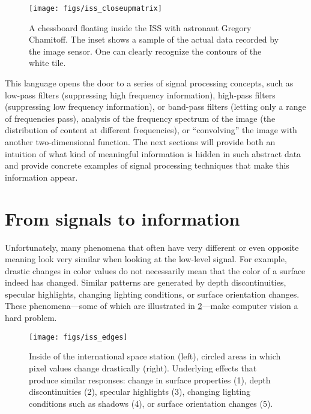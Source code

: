 \begin{figure}
    \centering
    \texttt{[image: figs/iss\_closeupmatrix]}
    \caption{A chessboard floating inside the ISS with astronaut Gregory Chamitoff. The inset shows a sample of the actual data recorded by the image sensor. One can clearly recognize the contours of the white tile.}
    \label{fig:iss_closeup}
\end{figure}

This language opens the door to a series of signal processing concepts, such as low-pass filters (suppressing high frequency information), high-pass filters (suppressing low frequency information), or band-pass filters (letting only a range of frequencies pass), analysis of the frequency spectrum of the image (the distribution of content at different frequencies), or ``convolving'' the image with another two-dimensional function. The next sections will provide both an intuition of what kind of meaningful information is hidden in such abstract data and provide concrete examples of signal processing techniques that make this information appear.

\section{From signals to information}

Unfortunately, many phenomena that often have very different or even opposite meaning look very similar when looking at the low-level signal. For example, drastic changes in color values do not necessarily mean that the color of a surface indeed has changed. Similar patterns are generated by depth discontinuities, specular highlights, changing lighting conditions, or surface orientation changes. These phenomena---some of which are illustrated in \cref{fig:iss_edges}---make computer vision a hard problem.

\begin{figure}[!htb]
    \centering
    \texttt{[image: figs/iss\_edges]}
    \caption{Inside of the international space station (left), circled areas in which pixel values change drastically (right). Underlying effects that produce similar responses: change in surface properties (1), depth discontinuities (2), specular highlights (3), changing lighting conditions such as shadows (4), or surface orientation changes (5).
    \label{fig:iss_edges}}
\end{figure}

